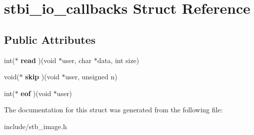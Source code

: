 \hypertarget{structstbi__io__callbacks}{}\section{stbi\+\_\+io\+\_\+callbacks Struct Reference}
\label{structstbi__io__callbacks}
\subsection*{Public Attributes}
\begin{DoxyCompactItemize}
\item 
\hypertarget{structstbi__io__callbacks_a623e46b3a2a019611601409926283a88}{}int($\ast$ {\bfseries read} )(void $\ast$user, char $\ast$data, int size)\label{structstbi__io__callbacks_a623e46b3a2a019611601409926283a88}

\item 
\hypertarget{structstbi__io__callbacks_aedb03a587afc3bffe28979c4e1b981bd}{}void($\ast$ {\bfseries skip} )(void $\ast$user, unsigned n)\label{structstbi__io__callbacks_aedb03a587afc3bffe28979c4e1b981bd}

\item 
\hypertarget{structstbi__io__callbacks_a319639db2f76e715eed7a7a974136832}{}int($\ast$ {\bfseries eof} )(void $\ast$user)\label{structstbi__io__callbacks_a319639db2f76e715eed7a7a974136832}

\end{DoxyCompactItemize}


The documentation for this struct was generated from the following file\+:\begin{DoxyCompactItemize}
\item 
include/stb\+\_\+image.\+h\end{DoxyCompactItemize}

